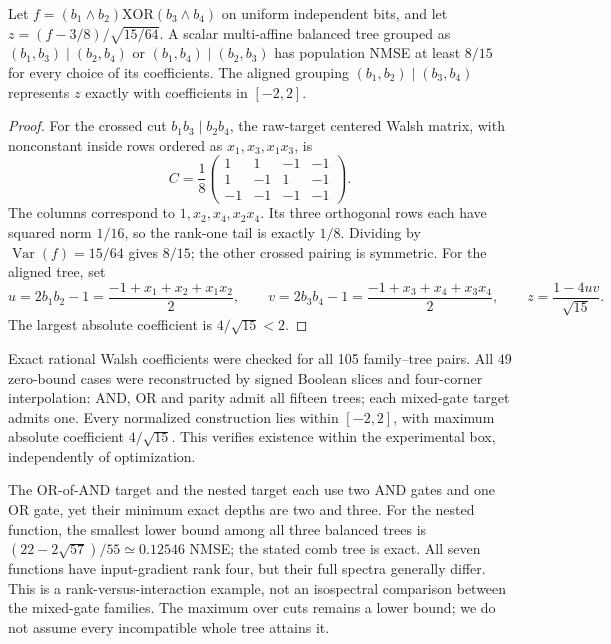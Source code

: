 \begin{proposition}
\label{prop:boolean_xor_and}
Let $f=(b_1\land b_2)\mathbin{\mathrm{XOR}}(b_3\land b_4)$ on uniform
independent bits, and let $z=(f-3/8)/\sqrt{15/64}$. A scalar multi-affine
balanced tree grouped as $(b_1,b_3)\mid(b_2,b_4)$ or
$(b_1,b_4)\mid(b_2,b_3)$ has population NMSE at least $8/15$ for every
choice of its coefficients. The aligned grouping
$(b_1,b_2)\mid(b_3,b_4)$ represents $z$ exactly with coefficients in
$[-2,2]$.
\end{proposition}
\begin{proof}
For the crossed cut $b_1b_3\mid b_2b_4$, the raw-target centered Walsh matrix,
with nonconstant inside rows ordered as $x_1,x_3,x_1x_3$, is
\[
 C=\frac18\begin{pmatrix}
 1&1&-1&-1\\
 1&-1&1&-1\\
 -1&-1&-1&-1
 \end{pmatrix}.
\]
The columns correspond to $1,x_2,x_4,x_2x_4$. Its three orthogonal rows each
have squared norm $1/16$, so the rank-one tail is exactly $1/8$.
Dividing by $\operatorname{Var}(f)=15/64$ gives $8/15$; the other crossed
pairing is symmetric. For the aligned tree, set
\[
 u=2b_1b_2-1=\frac{-1+x_1+x_2+x_1x_2}{2},\qquad
 v=2b_3b_4-1=\frac{-1+x_3+x_4+x_3x_4}{2},\qquad
 z=\frac{1-4uv}{\sqrt{15}}.
\]
The largest absolute coefficient is $4/\sqrt{15}<2$.
\end{proof}

Exact rational Walsh coefficients were checked for all 105 family--tree pairs. All 49 zero-bound cases were reconstructed by signed Boolean slices and four-corner interpolation: AND, OR and parity admit all fifteen trees; each mixed-gate target admits one. Every normalized construction lies within $[-2,2]$, with maximum absolute coefficient $4/\sqrt{15}$. This verifies existence within the experimental box, independently of optimization.

The OR-of-AND target and the nested target each use two AND gates and one OR
gate, yet their minimum exact depths are two and three. For the nested
function, the smallest lower bound among all three balanced trees is
$(22-2\sqrt{57})/55\simeq0.12546$ NMSE; the stated comb tree is exact.
All seven functions have input-gradient rank four, but their full spectra
generally differ. This is a rank-versus-interaction example, not an
isospectral comparison between the mixed-gate families. The maximum over
cuts remains a lower bound; we do not assume every incompatible whole tree
attains it.

